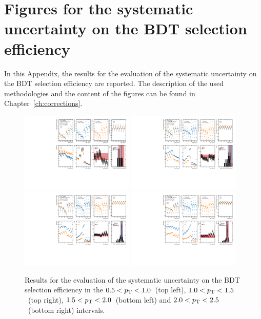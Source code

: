 \chapter[Figures for the systematic uncertainty on the BDT selection efficiency]{Figures for the systematic\\uncertainty on the BDT selection\\ efficiency}\label{app:bdt}
In this Appendix, the results for the evaluation of the systematic uncertainty on the BDT selection efficiency are reported. The description of the used methodologies and the content of the figures can be found in Chapter~\ref{ch:corrections}.

\begin{figure}
    \centering
    \includegraphics[width=0.48\textwidth]{Figures/Chapter 6/AllSystBDT/BDTsyst0.pdf}
    \includegraphics[width=0.48\textwidth]{Figures/Chapter 6/AllSystBDT/BDTsyst1.pdf}
    \includegraphics[width=0.48\textwidth]{Figures/Chapter 6/AllSystBDT/BDTsyst2.pdf}
    \includegraphics[width=0.48\textwidth]{Figures/Chapter 6/AllSystBDT/BDTsyst3.pdf}
    \caption{Results for the evaluation of the systematic uncertainty on the BDT selection efficiency in the $0.5 < p_\mathrm{T} < 1.0$~\gevc (top left), $1.0 < p_\mathrm{T} < 1.5$~\gevc (top right), $1.5 < p_\mathrm{T} < 2.0$~\gevc (bottom left) and $2.0 < p_\mathrm{T} < 2.5$~\gevc (bottom right) intervals.}
\end{figure}

